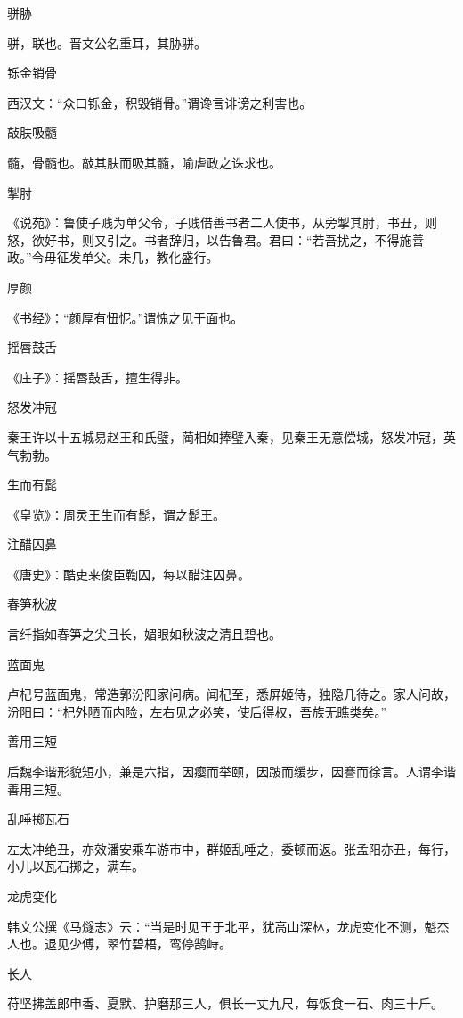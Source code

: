 \documentclass[a4paper,12pt,UTF8,twoside]{ctexbook}
\begin{document}
    骈胁
    
    骈，联也。晋文公名重耳，其胁骈。
    
    铄金销骨
    
    西汉文：“众口铄金，积毁销骨。”谓谗言诽谤之利害也。
    
    敲肤吸髓
    
    髓，骨髓也。敲其肤而吸其髓，喻虐政之诛求也。
    
    掣肘
    
    《说苑》：鲁使子贱为单父令，子贱借善书者二人使书，从旁掣其肘，书丑，则怒，欲好书，则又引之。书者辞归，以告鲁君。君曰：“若吾扰之，不得施善政。”令毋征发单父。未几，教化盛行。
    
    厚颜
    
    《书经》：“颜厚有忸怩。”谓愧之见于面也。
    
    摇唇鼓舌
    
    《庄子》：摇唇鼓舌，擅生得非。
    
    怒发冲冠
    
    秦王许以十五城易赵王和氏璧，蔺相如捧璧入秦，见秦王无意偿城，怒发冲冠，英气勃勃。
    
    生而有髭
    
    《皇览》：周灵王生而有髭，谓之髭王。
    
    注醋囚鼻
    
    《唐史》：酷吏来俊臣鞫囚，每以醋注囚鼻。
    
    春笋秋波
    
    言纤指如春笋之尖且长，媚眼如秋波之清且碧也。
    
    蓝面鬼
    
    卢杞号蓝面鬼，常造郭汾阳家问病。闻杞至，悉屏姬侍，独隐几待之。家人问故，汾阳曰：“杞外陋而内险，左右见之必笑，使后得权，吾族无瞧类矣。”
    
    善用三短
    
    后魏李谐形貌短小，兼是六指，因瘿而举颐，因跛而缓步，因謇而徐言。人谓李谐善用三短。
    
    乱唾掷瓦石
    
    左太冲绝丑，亦效潘安乘车游市中，群姬乱唾之，委顿而返。张孟阳亦丑，每行，小儿以瓦石掷之，满车。
    
    龙虎变化
    
    韩文公撰《马燧志》云：“当是时见王于北平，犹高山深林，龙虎变化不测，魁杰人也。退见少傅，翠竹碧梧，鸾停鹄峙。
    
    长人
    
    苻坚拂盖郎申香、夏默、护磨那三人，俱长一丈九尺，每饭食一石、肉三十斤。
    
\end{document}

